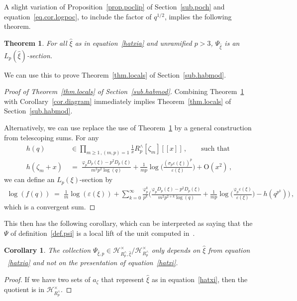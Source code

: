 \documentclass[12pt,reqno]{amsart}
\newcounter{theoremcount}
\newtheorem{theorem}[theoremcount]{Theorem}
\newtheorem{corollary}[proposition]{Corollary}
\theoremstyle{definition}
\def\calH{\mathcal H}
\def\ve{\varepsilon}
\def\be{\begin{equation}}
\def\ee{\end{equation}}
\def\z{\zeta}
\def\={\;=\;}
\def\fr{\mathrm{\varphi}_p}
\begin{document}
A slight variation of Proposition~\ref{prop.poclip} of Section~\ref{sub.poch} and
equation~\eqref{eq.cor.logpoc}, to include the factor of $q^{1/2}$, implies
the following theorem.

\begin{theorem}
\label{thm.Psi}  
For all $\widehat\xi$ as in equation~\eqref{hatxia} and unramified $p>3$,
$\Psi_{\widehat\xi}$ is an $L_{p}(\widehat\xi)$-section.
\end{theorem}

We can use this to prove Theorem~\ref{thm.locals} of Section~\ref{sub.habmod}.

\begin{proof}[Proof of Theorem~\ref{thm.locals} of Section~\ref{sub.habmod}]
Combining Theorem~\ref{thm.Psi} with Corollary~\ref{cor.diagram} immediately
implies Theorem~\ref{thm.locals} of Section~\ref{sub.habmod}.

Alternatively, we can use replace the use of Theorem~\ref{thm.Psi} by a general
construction from telescoping sums. For any
\be
\begin{aligned}
  h(q)&\;\in\prod_{m \geq1\,,(m,p)=1}\frac{1}{x}R^\wedge_p[\z_m][\![x]\!]\,,\qquad
  \text{such that}\\
  h(\z_m+x)
  &\=
  \frac{\fr D_{p}(\xi)-p^2D_{p}(\xi)}{m^2p^2\log(q)}
  +\frac{1}{mp}\log\Big(\frac{(\sigma_p\ve(\xi))^{p}}{\ve(\xi)}\Big)+\mathrm{O}(x^2)\,,
\end{aligned}
\ee
we can define an $L_p(\xi)$-section by
\be
\begin{aligned}
\log(f(q)) \= \frac{1}{m}\log(\ve(\xi)) +
\sum_{k=0}^{\infty}\frac{\fr^{k}}{p^k}\Big(
\frac{\fr D_{p}(\xi)-p^2D_{p}(\xi)}{m^2p^{2+k}\log(q)}
+\frac{1}{mp}\log\Big(\frac{\fr\ve(\xi)}{\ve(\xi)}\Big)-h(q^{p^k})\Big)\,,
\end{aligned}
\ee
which is a convergent sum.
\end{proof}

This then has the following corollary, which can be interpreted as saying
that the $\Psi$ of definition~\ref{def.psi} is a local lift of the unit computed
in~\cite{CGZ}.

\begin{corollary}
The collection $\Psi_{\widehat\xi,p}\in\calH_{R^\wedge_p,\widehat\xi}^{\times}/
\calH_{R^\wedge_p}^{\times}$ only depends on $\widehat\xi$ from equation
~\eqref{hatxia} and not on the presentation of equation~\eqref{hatxi}.
\end{corollary}

\begin{proof}
If we have two sets of $a_\z$ that represent $\widehat\xi$ as in equation~\eqref{hatxi},
then the quotient is in $\calH_{R^\wedge_p}^{\times}$.
\end{proof}
\end{document}
